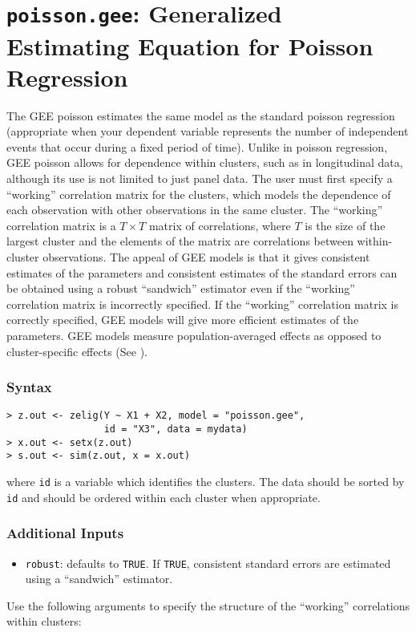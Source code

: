 \section{\texttt{poisson.gee}: Generalized Estimating Equation for Poisson Regression}
\label{poisson.gee}

The GEE poisson estimates the same model as the standard poisson
regression (appropriate when your dependent variable represents
the number of independent events that occur during a fixed period of time).  Unlike in poisson
regression, GEE poisson allows for dependence within clusters, such as
in longitudinal data, although its use is not limited to just
panel data.  The user must first specify a ``working''
correlation matrix for the clusters, which models the dependence of each observation with other observations in the same cluster.  The ``working'' correlation matrix is a $T \times T$ matrix of correlations, where $T$ is the size of the largest cluster and the elements of the matrix are correlations between within-cluster observations.  The appeal of GEE models is that it gives consistent estimates of the parameters and consistent estimates of
the standard errors can be obtained using a robust ``sandwich''
estimator even if the ``working'' correlation matrix is incorrectly
specified.  If the ``working'' correlation matrix is correctly specified, GEE models will give more efficient estimates of the parameters.  GEE models measure  population-averaged effects as opposed to cluster-specific effects (See \citet{Zorn01}).     

\subsubsection{Syntax}

\begin{verbatim}
> z.out <- zelig(Y ~ X1 + X2, model = "poisson.gee",
                 id = "X3", data = mydata)
> x.out <- setx(z.out)
> s.out <- sim(z.out, x = x.out)
\end{verbatim}

\noindent where \texttt{id} is a variable which identifies the clusters.  The data should be sorted by \texttt{id} and should be ordered within each cluster when appropriate.

\subsubsection{Additional Inputs}

\begin{itemize}
\item \texttt{robust}: defaults to \texttt{TRUE}.  If \texttt{TRUE}, consistent standard errors are estimated using a ``sandwich'' estimator.
\end{itemize}
Use the following arguments to specify the structure of the ``working'' correlations within clusters:

